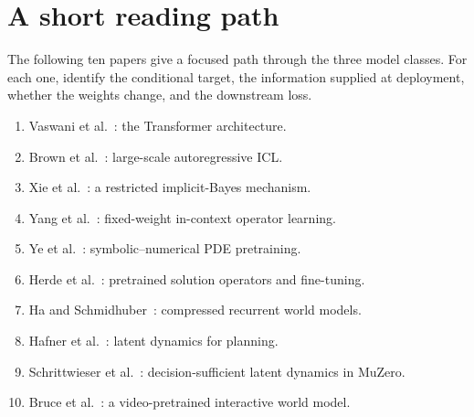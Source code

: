 \documentclass[11pt]{amsart}
\numberwithin{equation}{section}
\theoremstyle{definition}
\theoremstyle{plain}
\theoremstyle{remark}
\begin{document}
\section{A short reading path}

The following ten papers give a focused path through the three model classes.
For each one, identify the conditional target, the information supplied at
deployment, whether the weights change, and the downstream loss.
\begin{enumerate}[label=\textbf{R\arabic*.},leftmargin=*]
\item Vaswani et al.~\cite{VaswaniEtAl2017}: the Transformer architecture.
\item Brown et al.~\cite{BrownEtAl2020}: large-scale autoregressive ICL.
\item Xie et al.~\cite{XieEtAl2022}: a restricted implicit-Bayes mechanism.
\item Yang et al.~\cite{YangEtAl2023ICON}: fixed-weight in-context operator
learning.
\item Ye et al.~\cite{YeEtAl2024PDEformer}: symbolic--numerical PDE
pretraining.
\item Herde et al.~\cite{HerdeEtAl2024Poseidon}: pretrained solution
operators and fine-tuning.
\item Ha and Schmidhuber~\cite{HaSchmidhuber2018}: compressed recurrent world
models.
\item Hafner et al.~\cite{HafnerEtAl2019Planet}: latent dynamics for planning.
\item Schrittwieser et al.~\cite{SchrittwieserEtAl2020}: decision-sufficient
latent dynamics in MuZero.
\item Bruce et al.~\cite{BruceEtAl2024Genie}: a video-pretrained interactive
world model.
\end{enumerate}
\end{document}
